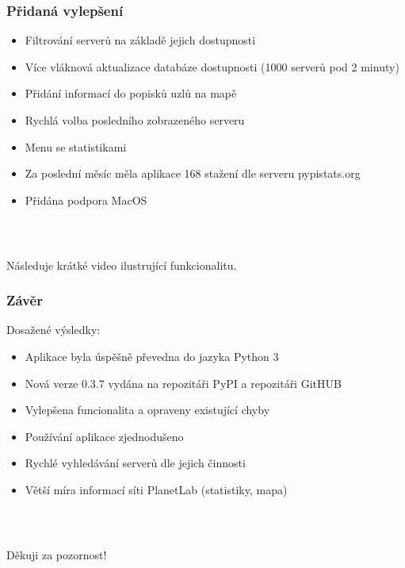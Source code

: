 \documentclass[%
  12pt,       				%
	t,                  %
	aspectratio=1610,   %
	unicode,						%
]{beamer}				    	%
\begin{document}
\begin{frame} 
\frametitle{Přidaná vylepšení}
\begin{itemize}
	\item Filtrování serverů na základě jejich dostupnosti
	\item Více vláknová aktualizace databáze dostupnosti (1000 serverů pod 2 minuty)
	\item Přidání informací do popisků uzlů na mapě
	\item Rychlá volba posledního zobrazeného serveru
	\item Menu se statistikami
	\item Za poslední měsíc měla aplikace 168 stažení dle serveru pypistats.org
	\item Přidána podpora MacOS
\end{itemize}
\end{frame}

\begin{frame}[c] 
\frametitle{\mbox{ }}
\begin{center}
	{\Huge Následuje krátké video ilustrující funkcionalitu.}
\end{center}
\end{frame}


\begin{frame} 
	\frametitle{Závěr}
	Dosažené výsledky:
	\begin{itemize}
		\item Aplikace byla úspěšně převedna do jazyka Python 3
		\item Nová verze 0.3.7 vydána na repozitáři PyPI a repozitáři GitHUB
		\item Vylepšena funcionalita a opraveny existující chyby
		\item Používání aplikace zjednodušeno
		\item Rychlé vyhledávání serverů dle jejich činnosti
		\item Větší míra informací síti PlanetLab (statistiky, mapa)
	\end{itemize}
\end{frame}


\begin{frame}[c] 
	\frametitle{\mbox{ }}
	\begin{center}
		{\Huge Děkuji za pozornost!}
	\end{center}
\end{frame}

\end{document}
